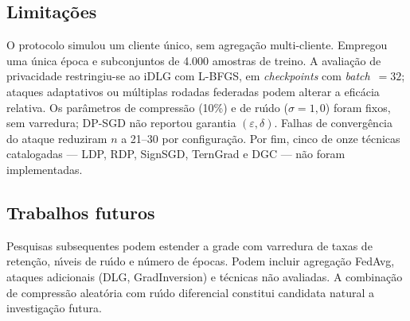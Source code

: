 \documentclass[kdmile,a4paper]{kdmile}
\begin{document}
\subsection{Limita\c{c}\~{o}es}

O protocolo simulou um cliente \'{u}nico, sem agrega\c{c}\~{a}o multi-cliente. Empregou uma \'{u}nica \'{e}poca e subconjuntos de 4.000 amostras de treino. A avalia\c{c}\~{a}o de privacidade restringiu-se ao iDLG com L-BFGS, em \textit{checkpoints} com \textit{batch}~$= 32$; ataques adaptativos ou m\'{u}ltiplas rodadas federadas podem alterar a efic\'{a}cia relativa. Os par\^{a}metros de compress\~{a}o (10\%) e de ru\'{\i}do ($\sigma = 1{,}0$) foram fixos, sem varredura; DP-SGD n\~{a}o reportou garantia $(\varepsilon, \delta)$. Falhas de converg\^{e}ncia do ataque reduziram $n$ a 21--30 por configura\c{c}\~{a}o. Por fim, cinco de onze t\'{e}cnicas catalogadas --- LDP, RDP, SignSGD, TernGrad e DGC --- n\~{a}o foram implementadas.

\subsection{Trabalhos futuros}

Pesquisas subsequentes podem estender a grade com varredura de taxas de reten\c{c}\~{a}o, n\'{\i}veis de ru\'{\i}do e n\'{u}mero de \'{e}pocas. Podem incluir agrega\c{c}\~{a}o FedAvg, ataques adicionais (DLG, GradInversion) e t\'{e}cnicas n\~{a}o avaliadas. A combina\c{c}\~{a}o de compress\~{a}o aleat\'{o}ria com ru\'{\i}do diferencial constitui candidata natural a investiga\c{c}\~{a}o futura.




\begin{received}
\end{received}
\end{document}
